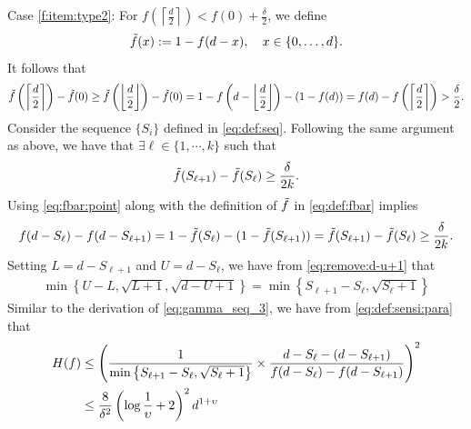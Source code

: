 \documentclass[onecolumn,letterpaper]{IEEEtran}
\newcommand{\cp}{{q}}
\newcommand{\cpn}{{\cp^*}}
\newcommand{\up}{{U}}
\newcommand{\lw}{{L}}
\newcommand{\fgap}{{\delta}}
\newcommand{\fH}{{H(f)}}
\newcommand{\ftau}{{\Gamma}}
\newcommand{\ftaup}{{\hat{\Gamma}}}
\newcommand{\fTn}{\ftau (\cpn)}
\newcommand{\fTpn}{\ftaup (\cpn)}
\newcommand{\cpns}{\cp_0}
\newcommand{\fTpns}{\ftaup (\cpns)}
\newcommand{\seq}{{S}}
\newcommand{\ups}{{\upsilon}}
\newcommand{\logu}{{k}}
\newcommand{\ind}{{i}}
\newcommand{\exiind}{{\ell}}
\newcommand{\fbar}{{\Tilde{f}}}
\begin{document}
Case \ref{f:item:type2}: For $f\left(\left\lceil \frac {d} {2}\right \rceil\right) < f(0)+\frac {\fgap}{2}$, we define \begin{align}
\label{eq:def:fbar}
    \fbar(x) := 1-f(d-x),\quad x\in\{0,\dots, d\}.
\end{align} 
It follows that
\begin{equation}
    \fbar \left( \left\lceil \frac{d}{2} \right\rceil \right) - \fbar(0) \geq \fbar \left( \left\lfloor \frac{d}{2} \right\rfloor \right) - \fbar(0) 
    =  1 - f\left( d - \left\lfloor \frac{d}{2} \right\rfloor \right)  - \left( 1 - f(d) \right) 
    = f(d) - f\left(\left\lceil \frac {d} {2}\right \rceil\right)  
    > \frac{\fgap}{2}.
\end{equation}
Consider the sequence $\{\seq_{\ind}\}$ defined in \eqref{eq:def:seq}. 
Following the same argument as above, we have that $\exists \exiind\in \{ 1,\cdots,\logu \}$ such that 
\begin{equation} 
\label{eq:fbar:point}
    \fbar(\seq_{\exiind+1}) - \fbar(\seq_{\exiind}) \ge \frac{\fgap}{2\logu}.
\end{equation}
Using \eqref{eq:fbar:point} along with the definition of $\fbar$ in \eqref{eq:def:fbar} implies  
\begin{equation}
    f(d - \seq_{\exiind}) - f(d - \seq_{\exiind+1}) =  1 - \fbar(\seq_{\exiind})  - ( 1 - \fbar(\seq_{\exiind+1}) ) = \fbar(\seq_{\exiind+1}) - \fbar(\seq_{\exiind}) \ge \frac{\fgap}{2\logu}.
\end{equation}
Setting $\lw = d - \seq_{\exiind+1}$ and $\up = d - \seq_{\exiind}$, we have from \eqref{eq:remove:d-u+1} that 
\begin{align*}
     \min\left\{\up-\lw , \sqrt{\lw+1} , \sqrt{d-\up+1}\right\}=\min\left\{ \seq_{\exiind+1}-\seq_{\exiind} , \sqrt{\seq_{\exiind}+1}\right\}
\end{align*}
Similar to the derivation of \eqref{eq:gamma_seq_3}, we have from \eqref{eq:def:sensi:para} that   
\begin{align}
 \fH&\leq \left(\frac{1}{\min\left\{\seq_{\exiind+1}-\seq_{\exiind}, \sqrt{\seq_{\exiind}+1 }\right \}}\times \frac{d-\seq_{\exiind}-\left(d-\seq_{\exiind+1}\right)}{f(d-\seq_{\exiind})-f(d-\seq_{\exiind+1})}\right)^2\notag\\ 
  &\leq \frac{8}{\fgap^2} \left(\log \frac{1}{\ups}+2 \right)^2 d^{1+\ups}
\end{align}
\end{document}
